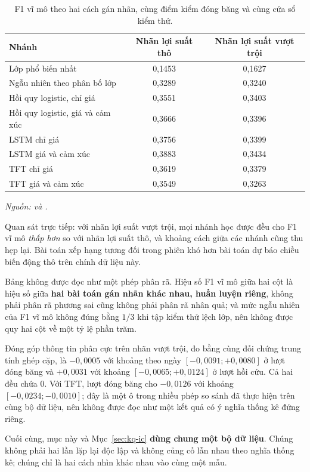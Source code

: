 \begin{table}[H]
  \centering
  \caption{F1 vĩ mô theo hai cách gán nhãn, cùng điểm kiểm đóng băng và cùng cửa sổ kiểm thử.}
  \label{tab:kq-excess}
  \begin{tabular}{l c c}
    \toprule
    Nhánh & Nhãn lợi suất thô & Nhãn lợi suất vượt trội \\
    \midrule
    Lớp phổ biến nhất & 0,1453 & 0,1627 \\
    Ngẫu nhiên theo phân bố lớp & 0,3289 & 0,3240 \\
    Hồi quy logistic, chỉ giá & 0,3551 & 0,3403 \\
    Hồi quy logistic, giá và cảm xúc & 0,3666 & 0,3396 \\
    LSTM chỉ giá & 0,3756 & 0,3399 \\
    LSTM giá và cảm xúc & 0,3883 & 0,3434 \\
    TFT chỉ giá & 0,3619 & 0,3379 \\
    TFT giá và cảm xúc & 0,3549 & 0,3263 \\
    \bottomrule
  \end{tabular}
\noindent\textit{Nguồn:  và .}
\end{table}

Quan sát trực tiếp: với nhãn lợi suất vượt trội, mọi nhánh học được đều cho F1 vĩ mô
\emph{thấp hơn} so với nhãn lợi suất thô, và khoảng cách giữa các nhánh cũng thu hẹp lại.
Bài toán xếp hạng tương đối trong phiên khó hơn bài toán dự báo chiều biến động thô trên
chính dữ liệu này.

Bảng không được đọc như một phép phân rã. Hiệu số F1 vĩ mô giữa hai cột là hiệu số giữa
\textbf{hai bài toán gán nhãn khác nhau, huấn luyện riêng}, không phải phân rã phương sai
cũng không phải phân rã nhân quả; và mức ngẫu nhiên của F1 vĩ mô không đúng bằng $1/3$ khi
tập kiểm thử lệch lớp, nên không được quy hai cột về một tỷ lệ phần trăm.

Đóng góp thông tin phân cực trên nhãn vượt trội, đo bằng cùng đối chứng trung tính ghép
cặp, là $-0{,}0005$ với khoảng theo ngày $[-0{,}0091; +0{,}0080]$ ở lượt đóng băng và
$+0{,}0031$ với khoảng $[-0{,}0065; +0{,}0124]$ ở lượt hồi cứu. Cả hai đều chứa 0. Với
TFT, lượt đóng băng cho $-0{,}0126$ với khoảng $[-0{,}0234; -0{,}0010]$; đây là một ô
trong nhiều phép so sánh đã thực hiện trên cùng bộ dữ liệu, nên không được đọc như một
kết quả có ý nghĩa thống kê đứng riêng.

Cuối cùng, mục này và Mục~\ref{sec:kq-ic} \textbf{dùng chung một bộ dữ liệu}. Chúng không
phải hai lần lặp lại độc lập và không củng cố lẫn nhau theo nghĩa thống kê; chúng chỉ là
hai cách nhìn khác nhau vào cùng một mẫu.

